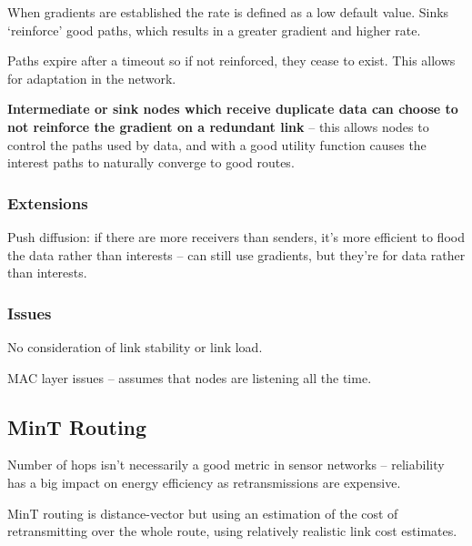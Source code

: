 \documentclass[a4paper, 11pt]{article}
\begin{document}
{{        When gradients are established the rate is defined as a low default value. Sinks `reinforce' good paths, which results in a greater gradient and higher rate.

        Paths expire after a timeout so if not reinforced, they cease to exist. This allows for adaptation in the network.

        \textbf{Intermediate or sink nodes which receive duplicate data can choose to not reinforce the gradient on a redundant link} -- this allows nodes to control the paths used by data, and with a good utility function causes the interest paths to naturally converge to good routes.

        \subsubsection*{Extensions}
        {
            Push diffusion: if there are more receivers than senders, it's more efficient to flood the data rather than interests -- can still use gradients, but they're for data rather than interests.
        }
        \subsubsection*{Issues}
        {
            No consideration of link stability or link load.

            MAC layer issues -- assumes that nodes are listening all the time.
        }
    }
    \subsection*{MinT Routing}
    {
        Number of hops isn't necessarily a good metric in sensor networks -- reliability has a big impact on energy efficiency as retransmissions are expensive.

        MinT routing is distance-vector but using an estimation of the cost of retransmitting over the whole route, using relatively realistic link cost estimates.
    }
}
\end{document}
